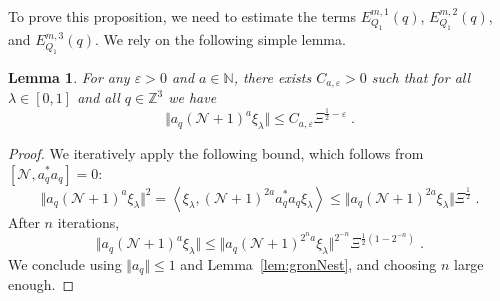 \documentclass[12pt,a4paper]{article}
\numberwithin{equation}{section}
\newcommand{\cN}{\mathcal{N}}
\newcommand{\1}{\mathbb{I}}
\newcommand{\N}{\mathbb{N}}
\newcommand{\Z}{\mathbb{Z}}
\newcommand{\half}{\frac{1}{2}}
\newcommand{\eva}[1]{\left\langle #1 \right\rangle}
\theoremstyle{plain}
\newtheorem{lemma}[theorem]{Lemma}
\theoremstyle{definition}
\theoremstyle{remark}
\theoremstyle{plain}
\theoremstyle{definition}
\theoremstyle{remark}
\begin{document}
To prove this proposition, we need to estimate the terms $ E^{m,1}_{Q_1}(q) $, $ E^{m,2}_{Q_1}(q) $, and $ E^{m,3}_{Q_1}(q) $. We rely on the following simple lemma.

\begin{lemma} \label{lem:Xi_halfminusepsilon}
For any $ \varepsilon > 0 $ and $ a \in \N $, there exists $ C_{a,\varepsilon} > 0 $ such that for all $ \lambda \in [0,1] $ and all $ q \in \Z^3 $ we have
\begin{equation} \label{eq:Xi_halfminusepsilon}
	\Vert a_q (\cN + 1)^a \xi_\lambda \Vert
	\le C_{a,\varepsilon} \Xi^{\half-\varepsilon} \;.
\end{equation}
\end{lemma}

\begin{proof}
We iteratively apply the following bound, which follows from $ [\cN, a_q^* a_q] = 0 $:
\begin{equation}
	\Vert a_q (\cN + 1)^a \xi_\lambda \Vert^2
	= \eva{\xi_\lambda, (\cN + 1)^{2a} a_q^* a_q \xi_\lambda}
	\le \Vert a_q (\cN + 1)^{2a} \xi_\lambda \Vert \Xi^{\frac 12} \;.
\end{equation}
After $ n $ iterations,
\begin{equation}
	\Vert a_q (\cN + 1)^a \xi_\lambda \Vert
	\le \Vert a_q (\cN + 1)^{2^n a} \xi_\lambda \Vert^{2^{-n}} \Xi^{\half (1-2^{-n})} \;.
\end{equation}
We conclude using $ \Vert a_q \Vert \le 1 $ and Lemma~\ref{lem:gronNest}, and choosing $ n $ large enough.
\end{proof}
\end{document}
